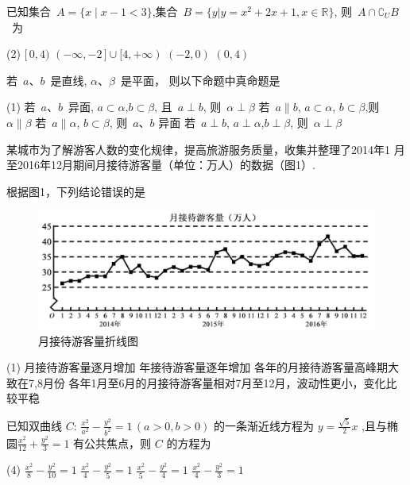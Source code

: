 \documentclass[a3paper, landscape, twocolumn, twoside, zihao = 5,
unicodeGBMath, %
]{ctexart}
\begin{document}
\begin{qus}
\item  已知集合~$A=\{x\mid {x-1}<3 \}$,集合~$B=\{y|
  y=x^2+2x+1,x\in\mathbb{R}\}$, 则~$A\cap \complement_U B$~为

  \begin{tasks}(2)
    \task $[\,0,4)$ \task $(-\infty,-2\,]\cup[4,+\infty)$ \task $(-2,0)$
    \task $(0,4)$
  \end{tasks}

\item  若~$a$、$b$~是直线, $\alpha$、$\beta$~是平面，
  则以下命题中真命题是

  \begin{tasks}(1)
    \task 若~$a$、$b$~异面, $a\subset\alpha$,$b\subset\beta$, 且~$a\perp b$, 则~$\alpha\perp\beta$
    \task 若~$a\parallel b$, $a\subset\alpha$, $b\subset\beta$,则~$\alpha\parallel\beta$
    \task 若~$a\parallel \alpha$, $b\subset\beta$, 则~$a$、$b$ 异面
    \task 若~$a\perp b$, $a\perp\alpha$,$b\perp\beta$, 则~$\alpha\perp\beta$
  \end{tasks}

\item 某城市为了解游客人数的变化规律，提高旅游服务质量，收集并整理了2014年1
  月至2016年12月期间月接待游客量（单位：万人）的数据（图1）.

  根据图1，下列结论错误的是

  \begin{figure}[!htb]
    \centering
    \includegraphics[width=0.8\linewidth]{zxt.jpg}
    \caption{月接待游客量折线图}
  \end{figure}%

  \begin{tasks}(1)
    \task 月接待游客量逐月增加 
    \task 年接待游客量逐年增加
    \task 各年的月接待游客量高峰期大致在7,8月份 
    \task 各年1月至6月的月接待游客量相对7月至12月，波动性更小，变化比较平稳 
  \end{tasks}

\item 已知双曲线 $C\colon\,\tfrac{x^2}{a^2}-\tfrac{y^2}{b^2}=1\,(a>0,b>0)$
  的一条渐近线方程为 $y=\tfrac{\sqrt{5}}{2}x$ ,且与椭
  圆$\tfrac{x^2}{12}+\tfrac{y^2}{3}=1$ 有公共焦点，则 $C$ 的方程为

  \begin{tasks}(4)
    \task $\tfrac{x^2}{8}-\tfrac{y^2}{10}=1$ \task $\tfrac{x^2}{4}-\tfrac{y^2}{5}=1$ \task $\tfrac{x^2}{5}-\tfrac{y^2}{4}=1$ \task $\tfrac{x^2}{4}-\tfrac{y^2}{3}=1$ 
  \end{tasks}

\end{qus}
\end{document}
